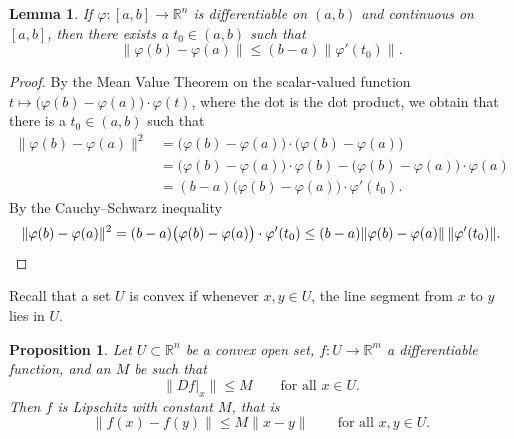 \documentclass[12pt,openany]{book}
\newcommand{\snorm}[1]{\lVert {#1} \rVert}
\newcommand{\R}{{\mathbb{R}}}
\theoremstyle{plain}
\newtheorem{lemma}[thm]{Lemma}
\newtheorem{prop}[thm]{Proposition}
\theoremstyle{remark}
\theoremstyle{definition}
\theoremstyle{exercise}
\theoremstyle{example}
\begin{document}
\begin{lemma}
If $\varphi \colon [a,b] \to \R^n$ is differentiable on $(a,b)$ and
continuous on $[a,b]$, then there exists a $t_0 \in (a,b)$ such that
\begin{equation*}
\snorm{\varphi(b)-\varphi(a)} \leq (b-a) \snorm{\varphi'(t_0)} .
\end{equation*}
\end{lemma}

\begin{proof}
By the Mean Value Theorem on the scalar-valued function
$t \mapsto \bigl(\varphi(b)-\varphi(a) \bigr) \cdot \varphi(t)$,
where the dot is the dot product, we obtain
that
there is a $t_0 \in (a,b)$ such that
\begin{equation*}
\begin{split}
\snorm{\varphi(b)-\varphi(a)}^2
& =
\bigl( \varphi(b)-\varphi(a) \bigr)
\cdot
\bigl( \varphi(b)-\varphi(a) \bigr)
\\
& =
\bigl(\varphi(b)-\varphi(a) \bigr) \cdot \varphi(b) - 
\bigl(\varphi(b)-\varphi(a) \bigr) \cdot \varphi(a)
\\
& = 
(b-a)
\bigl(\varphi(b)-\varphi(a) \bigr) \cdot \varphi'(t_0) .
\end{split}
\end{equation*}
By the Cauchy--Schwarz inequality
\begin{equation*}
\snorm{\varphi(b)-\varphi(a)}^2
=
(b-a)\bigl(\varphi(b)-\varphi(a) \bigr) \cdot \varphi'(t_0)
\leq
(b-a)
\snorm{\varphi(b)-\varphi(a)} \, \snorm{\varphi'(t_0)} . \qedhere
\end{equation*}
\end{proof}

Recall that a set $U$ is convex
if whenever $x,y \in U$, the line segment from
$x$ to $y$ lies in $U$.

\begin{prop} \label{mv:prop:convexlip}
Let $U \subset \R^n$ be a convex open set, $f \colon U \to \R^m$
a differentiable function, and an $M$ be such that
\begin{equation*}
\snorm{Df|_x} \leq M
\qquad \text{for all $x \in U$.}
\end{equation*}
Then $f$ is Lipschitz with constant $M$, that is
\begin{equation*}
\snorm{f(x)-f(y)} \leq M \snorm{x-y}
\qquad
\text{for all $x,y \in U$.}
\end{equation*}
\end{prop}
\end{document}
